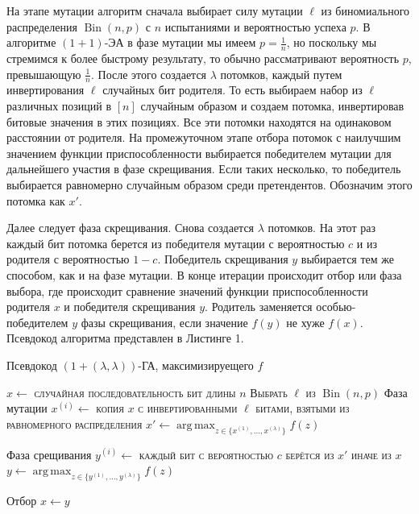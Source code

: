 \documentclass[times]{itmo-student-thesis}
\newcommand{\alglambdaf}{${(1 + (\lambda , \lambda))}$-ГА\xspace}
\newcommand{\oea}{\mbox{$(1 + 1)$-ЭА}\xspace}
\DeclareMathOperator{\Bin}{Bin}
\DeclareMathOperator*{\argmax}{arg\,max}
\begin{document}
На этапе мутации алгоритм сначала выбирает силу мутации $\ell$ из биномиального распределения $\Bin(n, p)$ с $n$ испытаниями и вероятностью успеха $p$. В алгоритме \oea в фазе мутации мы имеем $p = \frac{1}{n}$, но поскольку мы стремимся к более быстрому результату, то обычно рассматривают вероятность $p$, превышающую $\frac{1}{n}$.
После этого создается $\lambda$ потомков, каждый путем инвертирования $\ell$ случайных бит родителя. То есть выбираем набор из $\ell$ различных позиций в $[n]$ случайным образом и создаем потомка, инвертировав битовые значения в этих позициях.
Все эти потомки находятся на одинаковом расстоянии от родителя.
На промежуточном этапе отбора потомок с наилучшим значением функции приспособленности выбирается победителем мутации для дальнейшего участия в фазе скрещивания. Если таких несколько, то победитель выбирается равномерно случайным образом среди претендентов.
Обозначим этого потомка как $x'$.

Далее следует фаза скрещивания. Снова создается $\lambda$ потомков. На этот раз каждый бит потомка берется из победителя мутации с вероятностью $c$ и из родителя с вероятностью $1 - c$. Победитель скрещивания $y$ выбирается тем же способом, как и на фазе мутации. В конце итерации происходит отбор или фаза выбора, где происходит сравнение значений функции приспособленности родителя $x$ и победителя скрещивания $y$.
Родитель заменяется особью-победителем $y$ фазы скрещивания, если значение $f(y)$ не хуже $f(x)$. Псевдокод алгоритма представлен в Листинге 1.

\begin{algorithm}[h]
\caption{Псевдокод \alglambdaf, максимизируещего $f$}\label{ollgaMin}
\begin{algorithmic}
	\State$x \gets $ \textsc{случайная последовательность бит длины} $n$
		\State \textsc{Выбрать} $\ell$ \textsc{из} $\Bin\left(n, p\right)$ \Comment Фаза мутации
         		\State$x^{(i)} \gets$ \textsc{копия} $x$ \textsc{с инвертированными} $\ell$ \textsc{битами, взятыми из равномерного распределения}
         	\EndFor
	     	\State $x' \gets \argmax_{z \in \{x^{(1)}, \dots, x^{(\lambda)}\}}f(z)$

		 \Comment Фаза срещивания
	          	\State $y^{(i)} \gets$ \textsc{каждый бит с вероятностью $c$ берётся из $x'$ иначе из $x$}
		\EndFor
	      	\State $y \gets \argmax_{z \in \{y^{(1)}, \dots, y^{(\lambda)}\} }f(z)$

		 \Comment Отбор
			\State $x \gets y$
		\EndIf
	\EndFor
\end{algorithmic}
\end{algorithm}
\end{document}
